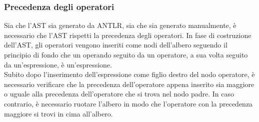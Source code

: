 \subsubsection{Precedenza degli operatori}
Sia che l'AST sia generato da ANTLR, sia che sia generato manualmente, è necessario
che l'AST rispetti la precedenza degli operatori. In fase di costruzione dell'AST,
gli operatori vengono inseriti come nodi dell'albero seguendo il principio di fondo 
che un operando seguito da un operatore, a sua volta seguito da un'espressione, è 
un'espressione. \\ 

Subito dopo l'inserimento dell'espressione come figlio destro del nodo operatore,
è necessario verificare che la precedenza dell'operatore appena inserito sia maggiore
o uguale alla precedenza dell'operatore che si trova nel nodo padre. In caso contrario,
è necessario ruotare l'albero in modo che l'operatore con la precedenza maggiore si
trovi in cima all'albero. \\

